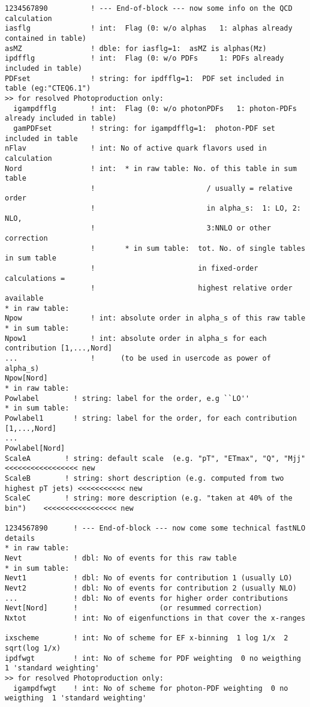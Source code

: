 {\begin{verbatim}
1234567890          ! --- End-of-block --- now some info on the QCD calculation
iasflg              ! int:  Flag (0: w/o alphas   1: alphas already contained in table)
asMZ                ! dble: for iasflg=1:  asMZ is alphas(Mz)
ipdfflg             ! int:  Flag (0: w/o PDFs     1: PDFs already included in table)
PDFset              ! string: for ipdfflg=1:  PDF set included in table (eg:"CTEQ6.1")
>> for resolved Photoproduction only:
  igampdfflg        ! int:  Flag (0: w/o photonPDFs   1: photon-PDFs already included in table)
  gamPDFset         ! string: for igampdfflg=1:  photon-PDF set included in table
nFlav               ! int: No of active quark flavors used in calculation
Nord                ! int:  * in raw table: No. of this table in sum table
                    !                          / usually = relative order 
                    !                          in alpha_s:  1: LO, 2: NLO, 
                    !                          3:NNLO or other correction
                    !       * in sum table:  tot. No. of single tables in sum table 
                    !                        in fixed-order calculations =
                    !                        highest relative order available
* in raw table:
Npow                ! int: absolute order in alpha_s of this raw table
* in sum table:
Npow1               ! int: absolute order in alpha_s for each contribution [1,...,Nord]
...                 !      (to be used in usercode as power of alpha_s) 
Npow[Nord]
* in raw table:
Powlabel        ! string: label for the order, e.g ``LO''
* in sum table:
Powlabel1       ! string: label for the order, for each contribution [1,...,Nord]
...                
Powlabel[Nord]
ScaleA        ! string: default scale  (e.g. "pT", "ETmax", "Q", "Mjj"       <<<<<<<<<<<<<<<<< new
ScaleB        ! string: short description (e.g. computed from two highest pT jets) <<<<<<<<<<< new
ScaleC        ! string: more description (e.g. "taken at 40% of the bin")    <<<<<<<<<<<<<<<<< new

1234567890      ! --- End-of-block --- now come some technical fastNLO details
* in raw table:
Nevt            ! dbl: No of events for this raw table
* in sum table:
Nevt1           ! dbl: No of events for contribution 1 (usually LO)
Nevt2           ! dbl: No of events for contribution 2 (usually NLO)
...             ! dbl: No of events for higher order contributions 
Nevt[Nord]      !                   (or resummed correction)
Nxtot           ! int: No of eigenfunctions in that cover the x-ranges 

ixscheme        ! int: No of scheme for EF x-binning  1 log 1/x  2 sqrt(log 1/x)
ipdfwgt         ! int: No of scheme for PDF weighting  0 no weigthing  1 'standard weighting'
>> for resolved Photoproduction only:
  igampdfwgt    ! int: No of scheme for photon-PDF weighting  0 no weigthing  1 'standard weighting'


\end{verbatim}}

